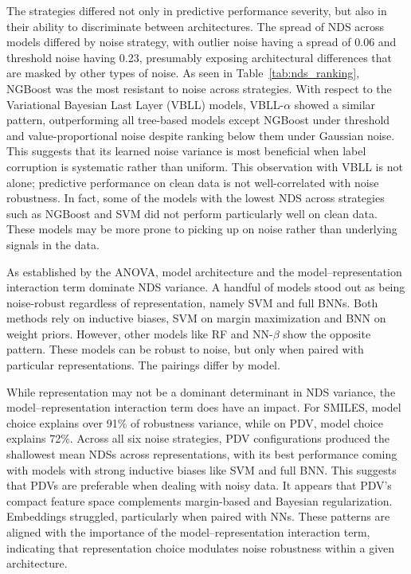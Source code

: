 The strategies differed not only in predictive performance severity, but also in their ability to discriminate between architectures. The spread of NDS across models differed by noise strategy, with outlier noise having a spread of 0.06 and threshold noise having 0.23, presumably exposing architectural differences that are masked by other types of noise. As seen in Table~\ref{tab:nds_ranking}, NGBoost was the most resistant to noise across strategies. With respect to the Variational Bayesian Last Layer (VBLL) models, VBLL-$\alpha$ showed a similar pattern, outperforming all tree-based models except NGBoost under threshold and value-proportional noise despite ranking below them under Gaussian noise. This suggests that its learned noise variance is most beneficial when label corruption is systematic rather than uniform. This observation with VBLL is not alone; predictive performance on clean data is not well-correlated with noise robustness. In fact, some of the models with the lowest NDS across strategies such as NGBoost and SVM did not perform particularly well on clean data. These models may be more prone to picking up on noise rather than underlying signals in the data. 

As established by the ANOVA, model architecture and the model--representation interaction term dominate NDS variance. A handful of models stood out as being noise-robust regardless of representation, namely SVM and full BNNs. Both methods rely on inductive biases, SVM on margin maximization and BNN on weight priors. However, other models like RF and NN-$\beta$ show the opposite pattern. These models can be robust to noise, but only when paired with particular representations. The pairings differ by model. 

While representation may not be a dominant determinant in NDS variance, the model--representation interaction term does have an impact. For SMILES, model choice explains over 91\% of robustness variance, while on PDV, model choice explains 72\%. Across all six noise strategies, PDV configurations produced the shallowest mean NDSs across representations, with its best performance coming with models with strong inductive biases like SVM and full BNN. This suggests that PDVs are preferable when dealing with noisy data. It appears that PDV's compact feature space complements margin-based and Bayesian regularization. Embeddings struggled, particularly when paired with NNs. These patterns are aligned with the importance of the model--representation interaction term, indicating that representation choice modulates noise robustness within a given architecture. 

